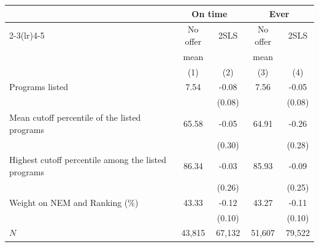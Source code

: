 \begin{tabular}{lcccc}
\toprule
 & \multicolumn{2}{c}{On time} & \multicolumn{2}{c}{Ever}\\
\cmidrule(lr){2-3}\cmidrule(lr){4-5}
 & No offer & 2SLS & No offer & 2SLS\\
 & mean &  & mean & \\
 & (1) & (2) & (3) & (4)\\
\midrule
\quad Programs listed & 7.54 & -0.08 & 7.56 & -0.05\\
 &  & (0.08) &  & (0.08)\\
\quad Mean cutoff percentile of the listed programs & 65.58 & -0.05 & 64.91 & -0.26\\
 &  & (0.30) &  & (0.28)\\
\quad Highest cutoff percentile among the listed programs & 86.34 & -0.03 & 85.93 & -0.09\\
 &  & (0.26) &  & (0.25)\\
\quad Weight on NEM and Ranking (\%) & 43.33 & -0.12 & 43.27 & -0.11\\
 &  & (0.10) &  & (0.10)\\
\midrule
$N$ & 43,815 & 67,132 & 51,607 & 79,522\\
\bottomrule
\end{tabular}
